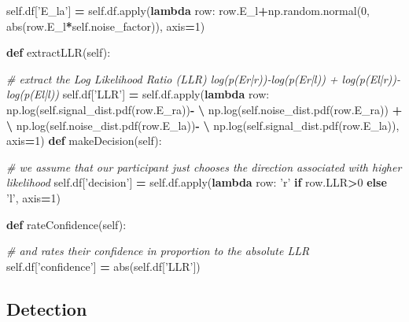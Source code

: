 \documentclass[12pt,twoside]{reedthesis}
\newenvironment{Shaded}{\begin{snugshade}}{\end{snugshade}}
\newcommand{\BuiltInTok}[1]{#1}
\newcommand{\CommentTok}[1]{\textcolor[rgb]{0.56,0.35,0.01}{\textit{#1}}}
\newcommand{\ControlFlowTok}[1]{\textcolor[rgb]{0.13,0.29,0.53}{\textbf{#1}}}
\newcommand{\DecValTok}[1]{\textcolor[rgb]{0.00,0.00,0.81}{#1}}
\newcommand{\KeywordTok}[1]{\textcolor[rgb]{0.13,0.29,0.53}{\textbf{#1}}}
\newcommand{\NormalTok}[1]{#1}
\newcommand{\OperatorTok}[1]{\textcolor[rgb]{0.81,0.36,0.00}{\textbf{#1}}}
\newcommand{\StringTok}[1]{\textcolor[rgb]{0.31,0.60,0.02}{#1}}
\newcommand{\VariableTok}[1]{\textcolor[rgb]{0.00,0.00,0.00}{#1}}
\begin{document}
\begin{Shaded}
\begin{Highlighting}[]
        \VariableTok{self}\NormalTok{.df[}\StringTok{'E_la'}\NormalTok{] }\OperatorTok{=} \VariableTok{self}\NormalTok{.df.}\BuiltInTok{apply}\NormalTok{(}\KeywordTok{lambda}\NormalTok{ row: row.E_l}\OperatorTok{+}\NormalTok{np.random.normal(}\DecValTok{0}\NormalTok{, }\BuiltInTok{abs}\NormalTok{(row.E_l}\OperatorTok{*}\VariableTok{self}\NormalTok{.noise_factor)), axis}\OperatorTok{=}\DecValTok{1}\NormalTok{)}
    
    \KeywordTok{def}\NormalTok{ extractLLR(}\VariableTok{self}\NormalTok{):}
        
        \CommentTok{# extract the Log Likelihood Ratio (LLR) log(p(Er|r))-log(p(Er|l)) + log(p(El|r))-log(p(El|l))}
        \VariableTok{self}\NormalTok{.df[}\StringTok{'LLR'}\NormalTok{] }\OperatorTok{=} \VariableTok{self}\NormalTok{.df.}\BuiltInTok{apply}\NormalTok{(}\KeywordTok{lambda}\NormalTok{ row: }
\NormalTok{                            np.log(}\VariableTok{self}\NormalTok{.signal_dist.pdf(row.E_ra))}\OperatorTok{-} \OperatorTok{\textbackslash{}}
\NormalTok{                            np.log(}\VariableTok{self}\NormalTok{.noise_dist.pdf(row.E_ra)) }\OperatorTok{+} \OperatorTok{\textbackslash{}}
\NormalTok{                            np.log(}\VariableTok{self}\NormalTok{.noise_dist.pdf(row.E_la))}\OperatorTok{-} \OperatorTok{\textbackslash{}}
\NormalTok{                            np.log(}\VariableTok{self}\NormalTok{.signal_dist.pdf(row.E_la)), axis}\OperatorTok{=}\DecValTok{1}\NormalTok{)}
    \KeywordTok{def}\NormalTok{ makeDecision(}\VariableTok{self}\NormalTok{):}
        
        \CommentTok{# we assume that our participant just chooses the direction associated with higher likelihood}
        \VariableTok{self}\NormalTok{.df[}\StringTok{'decision'}\NormalTok{] }\OperatorTok{=}  \VariableTok{self}\NormalTok{.df.}\BuiltInTok{apply}\NormalTok{(}\KeywordTok{lambda}\NormalTok{ row: }\StringTok{'r'} \ControlFlowTok{if}\NormalTok{ row.LLR}\OperatorTok{>}\DecValTok{0} \ControlFlowTok{else} \StringTok{'l'}\NormalTok{, axis}\OperatorTok{=}\DecValTok{1}\NormalTok{)}
        
    \KeywordTok{def}\NormalTok{ rateConfidence(}\VariableTok{self}\NormalTok{):}
        
        \CommentTok{# and rates their confidence in proportion to the absolute LLR}
        \VariableTok{self}\NormalTok{.df[}\StringTok{'confidence'}\NormalTok{] }\OperatorTok{=} \BuiltInTok{abs}\NormalTok{(}\VariableTok{self}\NormalTok{.df[}\StringTok{'LLR'}\NormalTok{])}
        
\end{Highlighting}
\end{Shaded}
\hypertarget{detection-1}{%
\subsection{Detection}\label{detection-1}}
\end{document}
